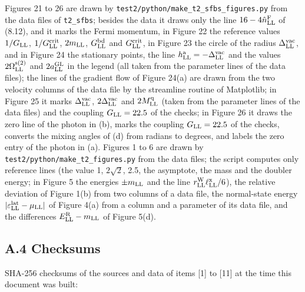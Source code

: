 \documentclass[
  10pt,
]{article}
\begin{document}
Figures 21 to 26 are drawn by
\texttt{test2/python/make\_t2\_sfbs\_figures.py} from the data files of
\texttt{t2\_sfbs}; besides the data it draws only the line
\(16-4\hat n^{\rm F}_{\rm LL}\) of (8.12), and it marks the Fermi
momentum, in Figure 22 the reference values \(1/G_{\rm LL}\),
\(1/G^{\rm crit}_{\rm LL}\), \(2m_{\rm LL}\), \(G^{\rm bd}_{\rm LL}\)
and \(G^{\rm crit}_{\rm LL}\), in Figure 23 the circle of the radius
\(\Delta^{\rm vac}_{\rm LL}\), and in Figure 24 the stationary points,
the line \(h^{\rm a}_{\rm LL}=-\Delta^{\rm vac}_{\rm LL}\) and the
values \(2\Omega^{\rm s(2)}_{\rm LL}\) and \(2a^{\rm GL}_{\rm LL}\) in
the legend (all taken from the parameter lines of the data files); the
lines of the gradient flow of Figure 24(a) are drawn from the two
velocity columns of the data file by the streamline routine of
Matplotlib; in Figure 25 it marks \(\Delta^{\rm vac}_{\rm LL}\),
\(2\Delta^{\rm vac}_{\rm LL}\) and \(2M^{\rm q}_{\rm LL}\) (taken from
the parameter lines of the data files) and the coupling
\(G_{\rm LL}=22.5\) of the checks; in Figure 26 it draws the zero line
of the photon in (b), marks the coupling \(G_{\rm LL}=22.5\) of the
checks, converts the mixing angles of (d) from radians to degrees, and
labels the zero entry of the photon in (a). Figures 1 to 6 are drawn by
\texttt{test2/python/make\_t2\_figures.py} from the data files; the
script computes only reference lines (the value 1, \(2\sqrt2\), 2.5, the
asymptote, the mass and the doubler energy; in Figure 5 the energies
\(\pm m_{\rm LL}\) and the line
\(r^{\rm W}_{\rm LL}\ell^{\rm x}_{\rm LL}/6\)), the relative deviation
of Figure 1(b) from two columns of a data file, the normal-state energy
\(\lvert\varepsilon^{\rm lat}_{\rm LL}-\mu_{\rm LL}\rvert\) of Figure
4(a) from a column and a parameter of its data file, and the differences
\(E^{\rm R}_{\rm LL}-m_{\rm LL}\) of Figure 5(d).

\hypertarget{a.4-checksums}{%
\subsection{A.4 Checksums}\label{a.4-checksums}}

SHA-256 checksums of the sources and data of items {[}1{]} to {[}11{]}
at the time this document was built:
\end{document}
